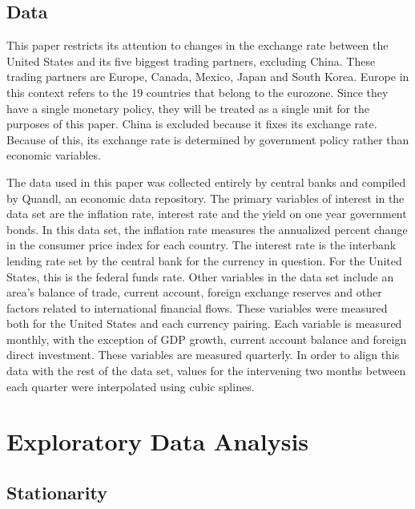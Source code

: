 \documentclass{sig-alternate-05-2015}
\begin{document}
\subsection{Data}
This paper restricts its attention to changes in the exchange rate between the United States and its five biggest trading partners, excluding China. These trading partners are Europe, Canada, Mexico, Japan and South Korea. Europe in this context refers to the 19 countries that belong to the eurozone. Since they have a single monetary policy, they will be treated as a single unit for the purposes of this paper. China is excluded because it fixes its exchange rate. Because of this, its exchange rate is determined by government policy rather than economic variables.
\par{} The data used in this paper was collected entirely by central banks and compiled by Quandl, an economic data repository. The primary variables of interest in the data set are the inflation rate, interest rate and the yield on one year government bonds. In this data set, the inflation rate measures the annualized percent change in the consumer price index for each country. The interest rate is the interbank lending rate set by the central bank for the currency in question. For the United States, this is the federal funds rate.  Other variables in the data set include an area's balance of trade, current account, foreign exchange reserves and other factors related to international financial flows. These variables were measured both for the United States and each currency pairing. Each variable is measured monthly, with the exception of GDP growth, current account balance and foreign direct investment. These variables are measured quarterly. In order to align this data with the rest of the data set, values for the intervening two months between each quarter were interpolated using cubic splines.

\section{Exploratory Data Analysis}

\subsection{Stationarity}
\end{document}
